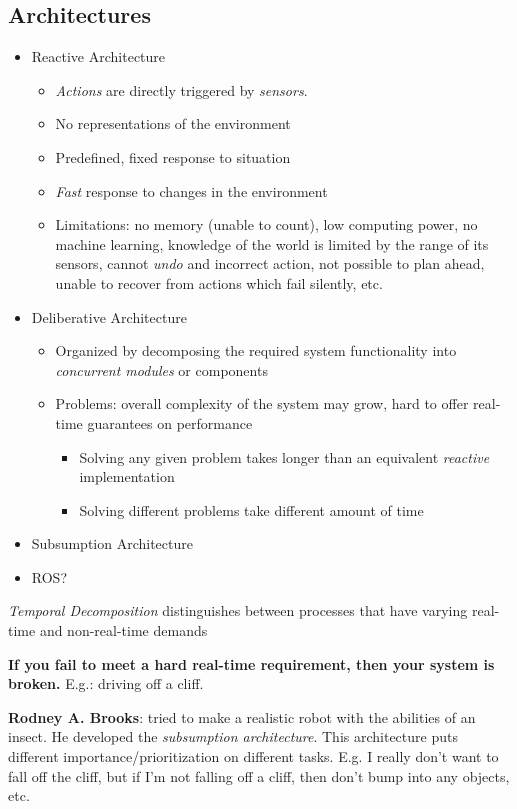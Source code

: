 \documentclass[13pt]{article}
\begin{document}
\subsection{Architectures}%
\noindent
\begin{itemize}
	\item Reactive Architecture
	\begin{itemize}
		\item \textit{Actions} are directly triggered by \textit{sensors}.
		\item No representations of the environment
		\item Predefined, fixed response to situation
		\item \textit{Fast} response to changes in the environment
		\item Limitations: no memory (unable to count), low computing power, no machine learning, knowledge of the world
			is limited by the range of its sensors, cannot \textit{undo} and incorrect action, not possible to plan
			ahead, unable to recover from actions which fail silently, etc.
	\end{itemize}
	\item Deliberative Architecture
	\begin{itemize}
		\item Organized by decomposing the required system functionality into \textit{concurrent modules} or components
		\item Problems: overall complexity of the system may grow, hard to offer real-time guarantees on performance
		\begin{itemize}
			\item Solving any given problem takes longer than an equivalent \textit{reactive} implementation
			\item Solving different problems take different amount of time
		\end{itemize}
	\end{itemize}
	\item Subsumption Architecture
	\item ROS?
\end{itemize}

\noindent
\textit{Temporal Decomposition} distinguishes between processes that have varying real-time and non-real-time demands

\noindent
\textbf{If you fail to meet a hard real-time requirement, then your system is broken.} E.g.: driving off a cliff.

\textbf{Rodney A. Brooks}: tried to make a realistic robot with the abilities of an insect. He developed the \textit{subsumption
architecture}. This architecture puts different importance/prioritization on different tasks. E.g. I really don't want
to fall off the cliff, but if I'm not falling off a cliff, then don't bump into any objects, etc.
\end{document}
